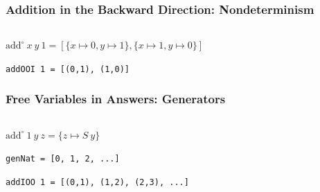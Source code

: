 \documentclass[xcolor={dvipsnames}, aspectratio=169]{beamer}
\begin{document}
\begin{frame}[fragile]
  \frametitle{Addition in the Backward Direction: Nondeterminism}
\begin{columns}
  \begin{column}[t]{0.49\textwidth}
    
  \end{column}
  \begin{column}[t]{0.49\textwidth}
    
  \end{column}
\end{columns}

\vfill
$\text{add}^{\circ}\ x\ y\ 1 = \left[\{x \mapsto  0, y \mapsto  1\}, \{x \mapsto  1, y \mapsto  0\} \right]$

\vfill

\lstinline{addOOI 1 = [(0,1), (1,0)]}

\end{frame}

\begin{frame}[fragile]
  \frametitle{Free Variables in Answers: Generators}
\begin{columns}
  \begin{column}[t]{0.49\textwidth}
    

    \vspace{0.5cm}
    $\text{add}^{\circ}\ 1\ y\ z = \{z \mapsto S\ y\}$

    \vspace{0.5cm}

    \lstinline{genNat = [0, 1, 2, ...]}

    \vspace{0.5cm}

    \lstinline{addIOO 1 = [(0,1), (1,2), (2,3), ...]} 
  \end{column}
  \begin{column}[t]{0.49\textwidth}
    
  \end{column}
\end{columns}
\end{frame}
\end{document}
